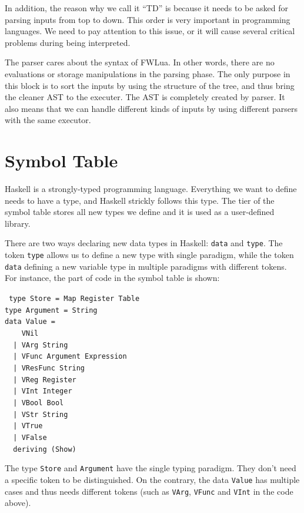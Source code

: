 In addition, the reason why we call it ``TD'' is because it needs to be asked for parsing inputs from top to down. This order is very important in programming languages. We need to pay attention to this issue, or it will cause several critical problems during being interpreted.

The parser cares about the syntax of FWLua. In other words, there are no evaluations or storage manipulations in the parsing phase. The only purpose in this block is to sort the inputs by using the structure of the tree, and thus bring the cleaner AST to the executer. The AST is completely created by parser. It also means that we can handle different kinds of inputs by using different parsers with the same executor.

\section{Symbol Table}
Haskell is a strongly-typed programming language. Everything we want to define needs to have a type, and Haskell strickly follows this type. The tier of the symbol table stores all new types we define and it is used as a user-defined library.

There are two ways declaring new data types in Haskell: {\tt data} and {\tt type}. The token {\tt type} allows us to define a new type with single paradigm, while the token {\tt data} defining a new variable type in multiple paradigms with different tokens. For instance, the part of code in the symbol table is shown:
\begin{flushleft}
{\tt 
type Store = Map Register Table\\
type Argument = String\\
data Value = \\
~~~~VNil\\
~~| VArg String\\
~~| VFunc Argument Expression\\
~~| VResFunc String\\
~~| VReg Register\\
~~| VInt Integer\\
~~| VBool Bool\\
~~| VStr String\\
~~| VTrue\\
~~| VFalse\\
~~deriving (Show)\\
}
\end{flushleft}
The type {\tt Store} and {\tt Argument} have the single typing paradigm. They don't need a specific token to be distinguished. On the contrary, the data {\tt Value} has multiple cases and thus needs different tokens (such as {\tt VArg}, {\tt VFunc} and {\tt VInt} in the code above).

